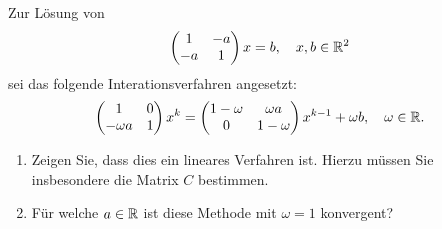 \documentclass{exercise}
\begin{document}
    \begin{problem}
        Zur Lösung von
        \[
            \begin{pmatrix}
                1 & -a\\
                -a & 1
            \end{pmatrix}x = b, \quad x, b \in \mathbb{R}^2
        \]
        sei das folgende Interationsverfahren angesetzt:
        \[
            \begin{pmatrix}
                1 & 0\\
                -\omega a & 1
            \end{pmatrix}x^k = \begin{pmatrix}
                1 - \omega & \omega a\\
                0 & 1 - \omega
            \end{pmatrix}x^{k - 1} + \omega b, \quad \omega \in \mathbb{R}.
        \]
        \begin{enumerate}
            \item Zeigen Sie, dass dies ein lineares Verfahren ist.
            Hierzu müssen Sie insbesondere die Matrix \(C\) bestimmen.
            \item Für welche \(a \in \mathbb{R}\) ist diese Methode mit \(\omega = 1\) konvergent?
        \end{enumerate}
    \end{problem}
    
\end{document}
